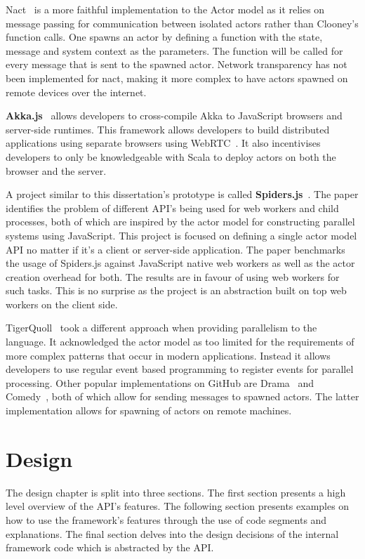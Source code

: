 \documentclass[12pt, a4paper]{report}
\theoremstyle{definition}
\theoremstyle{definition}%
\theoremstyle{definition}%
\theoremstyle{definition}%
\theoremstyle{definition}%
\theoremstyle{definition}%
\begin{document}
Nact~\cite{nact} is a more faithful implementation to the Actor model as it relies on message passing for communication between isolated actors rather than Clooney's function calls. One spawns an actor by defining a function with the state, message and system context as the parameters. The function will be called for every message that is sent to the spawned actor. Network transparency has not been implemented for nact, making it more complex to have actors spawned on remote devices over the internet.

\textbf{Akka.js}~\cite{stivan2015akka} allows developers to cross-compile Akka to JavaScript browsers and server-side runtimes. This framework allows developers to build distributed applications using separate browsers using WebRTC~. It also incentivises developers to only be knowledgeable with Scala to deploy actors on both the browser and the server.

A project similar to this dissertation's prototype is called \textbf{Spiders.js}~\cite{spidersjs}. The paper identifies the problem of different API's being used for web workers and child processes, both of which are inspired by the actor model for constructing parallel systems using JavaScript. This project is focused on defining a single actor model API no matter if it's a client or server-side application. The paper benchmarks the usage of Spiders.js against JavaScript native web workers as well as the actor creation overhead for both. The results are in favour of using web workers for such tasks. This is no surprise as the project is an abstraction built on top web workers on the client side.

TigerQuoll~\cite{tigerquoll} took a different approach when providing parallelism to the language. It acknowledged the actor model as too limited for the requirements of more complex patterns that occur in modern applications. Instead it allows developers to use regular event based programming to register events for parallel processing. Other popular implementations on GitHub are Drama~\cite{drama} and Comedy~\cite{comedy}, both of which allow for sending messages to spawned actors. The latter implementation allows for spawning of actors on remote machines.
\chapter{Design}
The design chapter is split into three sections. The first section presents a high level overview of the API's features. The following section presents examples on how to use the framework's features through the use of code segments and explanations. The final section delves into the design decisions of the internal framework code which is abstracted by the API.
\end{document}
